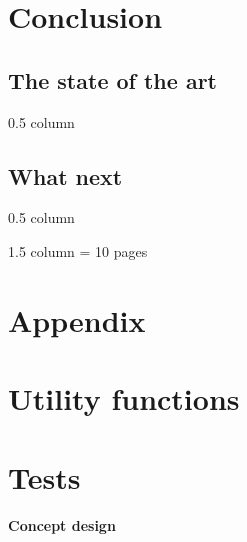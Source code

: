 \documentclass[11pt,oneside]{article}    %
\begin{document}
\section{Conclusion}\label{sec:conclusion}
\subsection{The state of the art}
0.5 column
\subsection{What next}
0.5 column



1.5 column
= 10 pages

\appendix
\section{Appendix}
\section{Utility functions}

\section{Tests}


\paragraph{Concept design}
\end{document}
